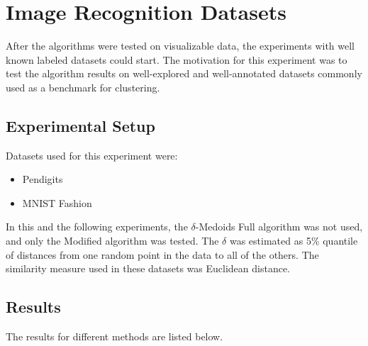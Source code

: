 \documentclass[thesis=B,english]{FITthesis}[2012/10/20]
\begin{document}
\newpage

\section{Image Recognition Datasets}\label{sec:exp3}

After the algorithms were tested on visualizable data, the experiments with well known labeled datasets could start.
The motivation for this experiment was to test the algorithm results on well-explored and well-annotated datasets commonly used as a benchmark for clustering.

\subsection{Experimental Setup}
Datasets used for this experiment were:
\begin{itemize}
    \item Pendigits
    \item MNIST Fashion
\end{itemize}

In this and the following experiments, the $\delta$-Medoids Full algorithm was not used, and only the Modified algorithm was tested.
The $\delta$ was estimated as 5\% quantile of distances from one random point in the data to all of the others.
The similarity measure used in these datasets was Euclidean distance.

\subsection{Results}

The results for different methods are listed below.
\end{document}
